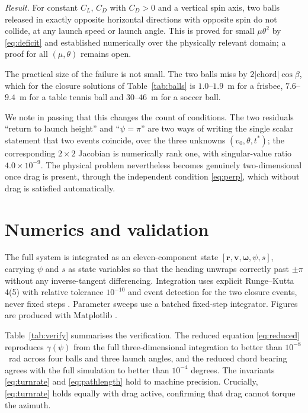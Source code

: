 \documentclass[aip,amsmath,amssymb,preprint,floatfix]{revtex4-2}
\newcommand{\vv}{\bm{v}}
\newcommand{\rr}{\bm{r}}
\begin{document}
\medskip
\noindent\textit{Result.} For constant $C_L$, $C_D$ with $C_D>0$ and a vertical spin
axis, two balls released in exactly opposite horizontal directions with opposite spin
do not collide, at any launch speed or launch angle. This is proved for small
$\mu\theta^2$ by \eqref{eq:deficit} and established numerically over the physically
relevant domain; a proof for all $(\mu,\theta)$ remains open.
\medskip

The practical size of the failure is not small. The two balls miss by
$2|\text{chord}|\cos\beta$, which for the closure solutions of
Table~\ref{tab:balls} is $1.0$--$1.9$~m for a frisbee, $7.6$--$9.4$~m for a table
tennis ball and $30$--$46$~m for a soccer ball.

We note in passing that this changes the count of conditions. The two residuals
``return to launch height'' and ``$\psi=\pi$'' are two ways of writing the single
scalar statement that two events coincide, over the three unknowns $(v_0,\theta,t^*)$;
the corresponding $2\times2$ Jacobian is numerically rank one, with singular-value
ratio $4.0\times10^{-9}$. The physical problem nevertheless becomes genuinely
two-dimensional once drag is present, through the independent condition
\eqref{eq:perp}, which without drag is satisfied automatically.

\section{Numerics and validation}
\label{sec:numerics}

The full system is integrated as an eleven-component state
$[\rr,\vv,\bm{\omega},\psi,s]$, carrying $\psi$ and $s$ as state variables so that the
heading unwraps correctly past $\pm\pi$ without any inverse-tangent differencing.
Integration uses explicit Runge--Kutta 4(5) with relative tolerance $10^{-10}$ and
event detection for the two closure events, never fixed steps
\cite{Virtanen2020,Harris2020}. Parameter sweeps use a batched fixed-step
integrator. Figures are produced with Matplotlib \cite{Hunter2007}.

Table~\ref{tab:verify} summarises the verification. The reduced equation
\eqref{eq:reduced} reproduces $\gamma(\psi)$ from the full three-dimensional
integration to better than $10^{-8}$~rad across four balls and three launch angles,
and the reduced chord bearing agrees with the full simulation to better than
$10^{-4}$ degrees. The invariants \eqref{eq:turnrate} and \eqref{eq:pathlength} hold
to machine precision. Crucially, \eqref{eq:turnrate} holds equally with drag active,
confirming that drag cannot torque the azimuth.
\end{document}
